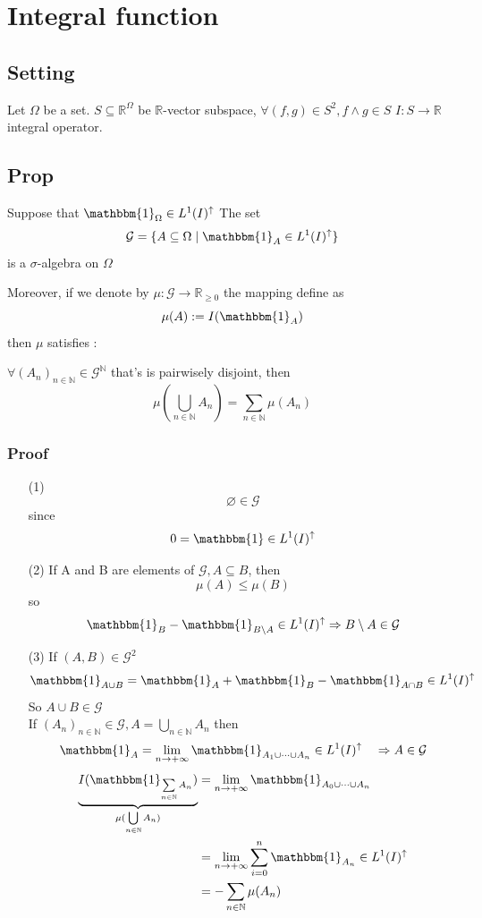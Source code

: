 \documentclass{book}
\begin{document}
\chapter{Integral function}
\section{Setting}
Let $\Omega$ be a set. $S\subseteq\mathbb{R}^\Omega$ be $\mathbb{R}$-vector subspace, $\forall(f,g)\in S^2,f\wedge g\in S$ $I:S\rightarrow \mathbb{R}$ integral operator.
\section{Prop}
Suppose that $\mathbbm{1}_\Omega\in L^1(I)^\uparrow$ The set $$\mathcal{G}=\{A\subseteq\Omega\mid \mathbbm{1}_A\in L^1(I)^\uparrow\}$$
is a $\sigma$-algebra on $\Omega$

Moreover, if we denote by $\mu:\mathcal{G}\rightarrow\mathbb{R}_{\geq0}$ the mapping define as $$\mu(A):= I(\mathbbm{1}_A)$$ then $\mu$ satisfies : 

$\forall(A_n)_{n\in \mathbb{N}}\in \mathcal{G}^\mathbb{N}$ that's is pairwisely disjoint, then $$\mu(\bigcup\limits_{n\in \mathbb{N}}A_n)=\sum\limits_{n\in \mathbb{N}}\mu(A_n)$$
\subsection{Proof}
\begin{itemize}
    \item [(1)]$$\varnothing\in \mathcal{G}$$ since $$0=\mathbbm{1}\in L^1(I)^\uparrow$$
    \item [(2)] If A and B are elements of $\mathcal{G}, A\subseteq B$, then $$\mu(A)\leq \mu(B)$$ so$$\mathbbm{1}_B-\mathbbm{1}_{B\setminus A}\in L^1(I)^\uparrow\Rightarrow B\setminus A\in \mathcal{G}$$
    \item [(3)]If $(A,B)\in \mathcal{G}^2$$$\mathbbm{1}_{A\cup B}=\mathbbm{1}_A+\mathbbm{1}_{B}-\mathbbm{1}_{A\cap B}\in L^1(I)^\uparrow$$
    So $A\cup B\in \mathcal{G}$
    \\ If $(A_n)_{n\in \mathbb{N}}\in \mathcal{G}, A=\bigcup\limits_{n\in \mathbb{N}}A_n$ then $$\mathbbm{1}_A=\lim\limits_{n\rightarrow+\infty}\mathbbm{1}_{A_1\cup\cdots\cup A_n}\in L^1(I)^\uparrow\quad\Rightarrow A\in \mathcal{G}$$
    $$
    \begin{aligned}
        \underbrace{I(\mathbbm{1}_{\sum\limits_{n\in \mathbb{N}}A_n})}\limits_{\mu(\bigcup\limits_{n\in \mathbb{N}}A_n)}
        &=\lim\limits_{n\rightarrow+\infty}\mathbbm{1}_{A_0\cup\cdots\cup A_n}\\ 
        &=\lim\limits_{n\rightarrow+\infty}\sum\limits_{i=0}^n\mathbbm{1}_{A_n}\in L^1(I)^\uparrow\\
        &=-\sum\limits_{n\in \mathbb{N}}\mu(A_n)
    \end{aligned}
    $$
\end{itemize}
\end{document}
